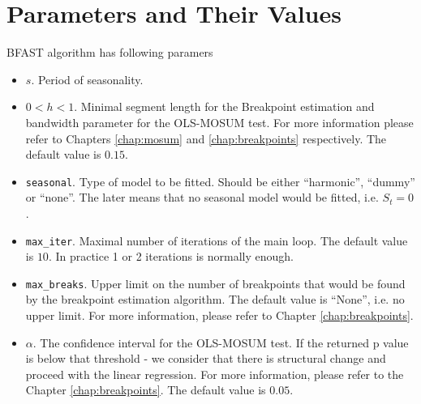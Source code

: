 \documentclass[main.tex]{subfiles}
\begin{document}
\section{Parameters and Their Values}
\label{sec:bfast_params}
BFAST algorithm has following paramers
\begin{itemize}
\item $s$. Period of seasonality.
\item $0<h<1$. Minimal segment length for the Breakpoint estimation and
  bandwidth parameter for the OLS-MOSUM test. For more information please refer
  to Chapters \ref{chap:mosum} and \ref{chap:breakpoints} respectively.
  The default value is $0.15$.
\item \texttt{seasonal}. Type of model to be fitted. Should be either
  ``harmonic'', ``dummy'' or ``none''. The later means that no seasonal model
  would be fitted, i.e. $S_t=0$.
\item \texttt{max\_iter}. Maximal number of iterations of the main loop. The
  default value is $10$. In practice 1 or 2 iterations is normally enough.
\item \texttt{max\_breaks}. Upper limit on the number of breakpoints that would be found by
  the breakpoint estimation algorithm. The default value is ``None'', i.e. no upper limit.
  For more information, please refer to Chapter \ref{chap:breakpoints}.
\item $\alpha$. The confidence interval for the OLS-MOSUM test. If the returned
  p value is below that threshold - we consider that there is structural change
  and proceed with the linear regression. For more information, please refer to
  the Chapter \ref{chap:breakpoints}. The default value is $0.05$. 
\end{itemize}

\biblio
\end{document}
